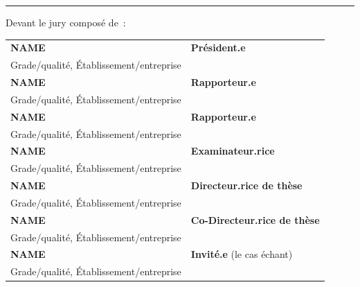 \begin{titlepage}
\begin{center}
\vspace{12pt}
\rule{5cm}{1pt}

\vspace{0.5cm}

\end{center}

Devant le jury composé de~:\\

\small {
\begin{tabular}{ll}
\textbf{NAME}           &\textbf{Président.e}\\
  Grade/qualité, Établissement/entreprise\\
\textbf{NAME}           &\textbf{Rapporteur.e}\\
	Grade/qualité, Établissement/entreprise\\
\textbf{NAME}           &\textbf{Rapporteur.e}\\
	Grade/qualité, Établissement/entreprise\\
\textbf{NAME}           &\textbf{Examinateur.rice}\\
	Grade/qualité, Établissement/entreprise\\
\textbf{NAME}           &\textbf{Directeur.rice de thèse}\\
	Grade/qualité, Établissement/entreprise\\
\textbf{NAME} 		&\textbf{Co-Directeur.rice de thèse}\\
	Grade/qualité, Établissement/entreprise\\		
\textbf{NAME}     &\textbf{Invité.e} (le cas échant)\\
  Grade/qualité, Établissement/entreprise\\
\end{tabular}
}


\end{titlepage}
